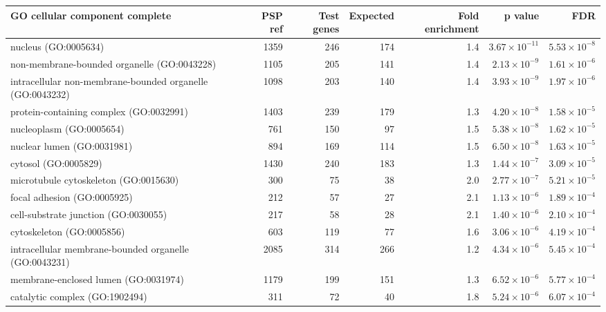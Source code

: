 \begin{table}[ht]
\centering
\begin{adjustbox}{width=\textwidth}

\begin{tabular}{lrrrrrr}
  \hline
GO cellular component complete & PSP ref & Test genes & Expected & Fold enrichment & p value & FDR \\ 
  \hline
nucleus (GO:0005634) & 1359 & 246 & 174 & 1.4 & $3.67 \times 10^{-11}$ & $5.53 \times 10^{-8}$ \\ 
  non-membrane-bounded organelle (GO:0043228) & 1105 & 205 & 141 & 1.4 & $2.13 \times 10^{-9}$ & $1.61 \times 10^{-6}$ \\ 
  intracellular non-membrane-bounded organelle (GO:0043232) & 1098 & 203 & 140 & 1.4 & $3.93 \times 10^{-9}$ & $1.97 \times 10^{-6}$ \\ 
  protein-containing complex (GO:0032991) & 1403 & 239 & 179 & 1.3 & $4.20 \times 10^{-8}$ & $1.58 \times 10^{-5}$ \\ 
  nucleoplasm (GO:0005654) & 761 & 150 & 97 & 1.5 & $5.38 \times 10^{-8}$ & $1.62 \times 10^{-5}$ \\ 
  nuclear lumen (GO:0031981) & 894 & 169 & 114 & 1.5 & $6.50 \times 10^{-8}$ & $1.63 \times 10^{-5}$ \\ 
  cytosol (GO:0005829) & 1430 & 240 & 183 & 1.3 & $1.44 \times 10^{-7}$ & $3.09 \times 10^{-5}$ \\ 
  microtubule cytoskeleton (GO:0015630) & 300 & 75 & 38 & 2.0 & $2.77 \times 10^{-7}$ & $5.21 \times 10^{-5}$ \\ 
  focal adhesion (GO:0005925) & 212 & 57 & 27 & 2.1 & $1.13 \times 10^{-6}$ & $1.89 \times 10^{-4}$ \\ 
  cell-substrate junction (GO:0030055) & 217 & 58 & 28 & 2.1 & $1.40 \times 10^{-6}$ & $2.10 \times 10^{-4}$ \\ 
  cytoskeleton (GO:0005856) & 603 & 119 & 77 & 1.6 & $3.06 \times 10^{-6}$ & $4.19 \times 10^{-4}$ \\ 
  intracellular membrane-bounded organelle (GO:0043231) & 2085 & 314 & 266 & 1.2 & $4.34 \times 10^{-6}$ & $5.45 \times 10^{-4}$ \\ 
  membrane-enclosed lumen (GO:0031974) & 1179 & 199 & 151 & 1.3 & $6.52 \times 10^{-6}$ & $5.77 \times 10^{-4}$ \\ 
  catalytic complex (GO:1902494) & 311 & 72 & 40 & 1.8 & $5.24 \times 10^{-6}$ & $6.07 \times 10^{-4}$ \\ 

\end{tabular}
\end{adjustbox}
\end{table}
